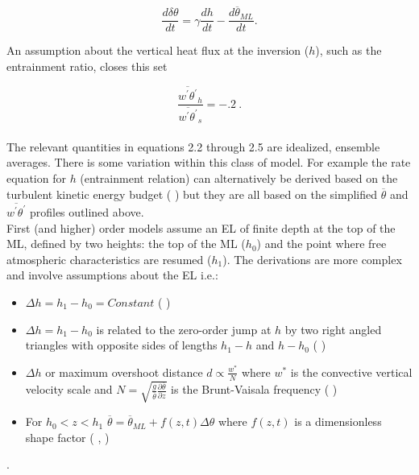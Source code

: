 \begin{equation}
\frac{d\delta \theta}{dt} = \gamma\frac{dh}{dt} - \frac{d\overline{\theta}_{ML}}{dt}.
\end{equation}

An assumption about the vertical heat flux at the inversion ($h$), such as the entrainment ratio, closes this set

\begin{equation}
\frac{\overline{w^{'}\theta^{'}}_{h}}{\overline{w^{'}\theta^{'}}_{s}} = -.2 \ .
\end{equation}\\

The relevant quantities in equations 2.2 through 2.5 are idealized, ensemble averages. There is some variation within this class of model.  For example the rate equation for $h$ (entrainment relation) can alternatively be derived based on the turbulent kinetic energy budget (\citeauthor{FedConzMir04} \cite{FedConzMir04}) but they are all based on the simplified $\overline{\theta}$ and $\overline{w^{'}\theta^{'}}$ profiles outlined above.\\  

First (and higher) order models assume an \acs{EL} of finite depth at the top of the ML, defined by two heights:  the top of the ML ($h_{0}$) and the point where free atmospheric characteristics are resumed ($h_{1}$).  The derivations are more complex and involve assumptions about the \acs{EL} i.e.: 

\begin{itemize}
\item{$\Delta h = h_{1} - h_{0} = Constant$ (\citeauthor{Betts74} \citeyear{Betts74})}

\item{$\Delta h = h_{1} - h_{0}$ is related to the zero-order jump at $h$ by two right angled triangles with opposite sides
of lengths $h_{1} - h$ and $h - h_{0}$ (\citeauthor{BatchGryn} \citeyear{BatchGryn})}

\item{$\Delta h$ or maximum overshoot distance $d \propto \frac{w^{*}}{N}$ where $w^{*}$ is the convective vertical velocity scale and $N = \sqrt{\frac{g}{\overline{\theta}} \frac{\partial \overline{\theta}}{\partial z}}$ is the Brunt-Vaisala frequency (\citeauthor{Stull73} \citeyear{Stull73})}
 
\item{For $h_{0}<z<h_{1}$ $\overline{\theta} = \overline{\theta}_{ML} + f(z,t) \Delta \theta$ where $f(z,t)$ is a dimensionless shape factor (\citeauthor{Deardorff79} \citeyear{Deardorff79}, \citeauthor{FedConzMir04} \citeyear{FedConzMir04})}
\end{itemize}
 .\\

